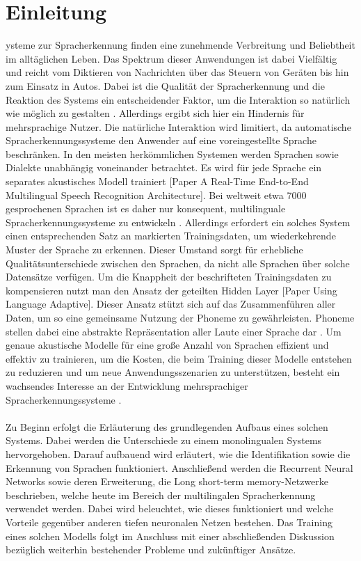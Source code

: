 \section{Einleitung}\label{sec:introduction}
ysteme zur Spracherkennung finden eine zunehmende Verbreitung und Beliebtheit im alltäglichen Leben. Das Spektrum dieser Anwendungen ist dabei Vielfältig und reicht vom Diktieren von Nachrichten über das Steuern von Geräten bis hin zum Einsatz in Autos. Dabei ist die Qualität der Spracherkennung und die Reaktion des Systems ein entscheidender Faktor, um die Interaktion so natürlich wie möglich zu gestalten \cite{Yu.2014}. Allerdings ergibt sich hier ein Hindernis für mehrsprachige Nutzer. Die natürliche Interaktion wird limitiert, da automatische Spracherkennungssysteme den Anwender auf eine voreingestellte Sprache beschränken. In den meisten herkömmlichen Systemen werden Sprachen sowie Dialekte unabhängig voneinander betrachtet. Es wird für jede Sprache ein separates akustisches Modell trainiert [Paper A Real-Time End-to-End Multilingual Speech Recognition Architecture]. Bei weltweit etwa 7000 gesprochenen Sprachen ist es daher nur konsequent, multilinguale Spracherkennungssysteme zu entwickeln \cite{Gary.2018}. Allerdings erfordert ein solches System einen entsprechenden Satz an markierten Trainingsdaten, um wiederkehrende Muster der Sprache zu erkennen. 
Dieser Umstand sorgt für erhebliche Qualitätsunterschiede zwischen den Sprachen, da nicht alle Sprachen über solche Datensätze verfügen. Um die Knappheit der beschrifteten Trainingsdaten zu kompensieren nutzt man den Ansatz der geteilten Hidden Layer [Paper Using Language Adaptive]. Dieser Ansatz stützt sich auf das Zusammenführen aller Daten, um so eine gemeinsame Nutzung der Phoneme zu gewährleisten.  Phoneme stellen dabei eine abstrakte Repräsentation aller Laute einer Sprache dar . Um genaue akustische Modelle für eine große Anzahl von Sprachen effizient und effektiv zu trainieren, um die Kosten, die beim Training dieser Modelle entstehen zu reduzieren und um neue Anwendungsszenarien zu unterstützen, besteht ein wachsendes Interesse an der Entwicklung mehrsprachiger Spracherkennungssysteme \cite{Yu.2014}. 
\\\\
Zu Beginn erfolgt die Erläuterung des grundlegenden Aufbaus eines solchen Systems. Dabei werden die Unterschiede zu einem monolingualen Systems hervorgehoben. Darauf aufbauend wird erläutert, wie die Identifikation sowie die Erkennung von Sprachen funktioniert. Anschließend werden die Recurrent Neural Networks sowie deren Erweiterung, die Long short-term memory-Netzwerke beschrieben, welche heute im Bereich der multilingalen Spracherkennung verwendet werden. Dabei wird beleuchtet, wie dieses funktioniert und welche Vorteile gegenüber anderen tiefen neuronalen Netzen bestehen. Das Training eines solchen Modells folgt im Anschluss mit einer abschließenden Diskussion bezüglich weiterhin bestehender Probleme und zukünftiger Ansätze.

